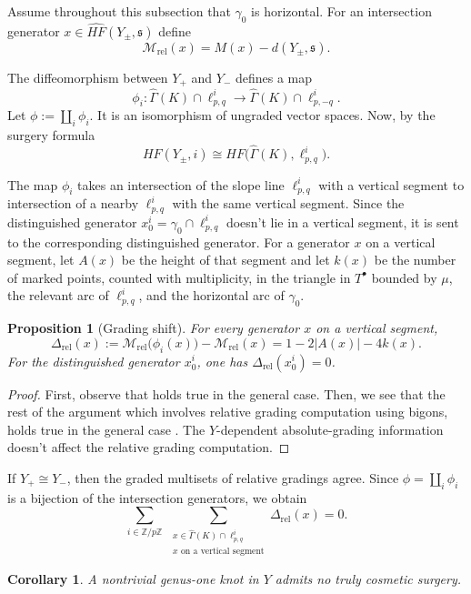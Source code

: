 \documentclass[12pt]{amsart}
\newtheorem{corollary}[theorem]{Corollary}
\newtheorem{proposition}[theorem]{Proposition}
\theoremstyle{definition}
\theoremstyle{definition}
\newcommand{\Z}{{\mathbb{Z}}}
\newcommand{\HF}{HF}
\newcommand{\HFhat}{\widehat{HF}}
\newcommand{\s}{\mathfrak{s}}
\newcommand{\Gh}{\widehat{\Gamma}}
\newcommand{\Mrel}{\mathcal{M}_{\mathrm{rel}}}
\newcommand{\Drel}{\Delta_{\mathrm{rel}}}
\newcommand{\Tpun}{T^{\bullet}}
\newcommand{\din}{d}
\begin{document}
Assume throughout this subsection that $\gamma_0$ is horizontal.  For an
intersection generator $x\in \HFhat(Y_\pm,\s)$ define
\[
\Mrel(x)=M(x)-\din(Y_\pm,\s).
\]

The diffeomorphism between $Y_{+}$ and $Y_{-}$ defines a map
\[
\phi_i:\Gh(K)\cap\ell^i_{p,q}\longrightarrow \Gh(K)\cap\ell^i_{p,-q}.
\]  Let $\phi:=\coprod_i\phi_i$. It is an isomorphism of ungraded vector spaces.
Now, by the surgery formula  \[ \HF(Y_{\pm},i) \cong HF\bigl(\Gh(K),\ell^i_{p,q}\bigr). \]

The map $\phi_i$ takes an intersection  of the slope line $\ell^i_{p,q}$ with a vertical segment to intersection of a nearby  $\ell^i_{p,q}$ with the same
vertical segment. Since the distinguished generator $x_0^i=\gamma_0\cap \ell^i_{p,q}$ doesn't lie in a vertical segment, it is sent to the corresponding distinguished generator.
For a generator $x$ on a vertical segment, let $A(x)$ be the height of that
segment and let $k(x)$ be the number of marked points, counted with
multiplicity, in the triangle in $\Tpun$ bounded by $\mu$, the relevant arc of
$\ell^i_{p,q}$, and the horizontal arc of $\gamma_0$.

\begin{proposition}[Grading shift]\label{prop:grading-shift}
For every generator $x$ on a vertical segment,
\[
\Drel(x):=\Mrel\bigl(\phi_i(x)\bigr)-\Mrel(x)=1-2|A(x)|-4k(x).
\]
For the distinguished generator $x_0^i$, one has $\Drel(x_0^i)=0$.
\end{proposition}

\begin{proof}
First, observe that \cite[Lemma~13]{Han} holds true in the general case. Then, we see that the rest of the argument which involves  relative grading computation using bigons, holds true in the general case   \cite[Proposition~25]{Han}.  The
$Y$-dependent absolute-grading information doesn't affect the relative grading computation.
\end{proof}

If $Y_+\cong Y_-$, then the graded multisets of relative gradings agree.  Since
$\phi=\coprod_i\phi_i$ is a bijection of the intersection generators, we obtain
\begin{equation}\label{eq:sumDelta}
\sum_{i\in\Z/p\Z}\ \sum_{\substack{x\in \Gh(K)\cap \ell^i_{p,q}\\
x\text{ on a vertical segment}}} \Drel(x)=0.
\end{equation}

\begin{corollary}\label{cor:genus-one}
A nontrivial genus-one knot in $Y$ admits no truly cosmetic surgery.
\end{corollary}
\end{document}
